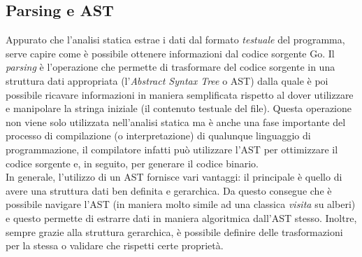 \subsection{Parsing e AST}
Appurato che l'analisi statica estrae i dati dal formato \emph{testuale} del programma, serve capire come è possibile ottenere informazioni dal codice sorgente Go. Il \emph{parsing} è l'operazione che permette di trasformare del codice sorgente in una struttura dati appropriata (l'\emph{Abstract Syntax Tree} o AST) dalla quale è poi possibile ricavare informazioni in maniera semplificata rispetto al dover utilizzare e manipolare la stringa iniziale (il contenuto testuale del file). Questa operazione non viene solo utilizzata nell'analisi statica ma è anche una fase importante del processo di compilazione (o interpretazione) di qualunque linguaggio di programmazione, il compilatore infatti può utilizzare l'AST per ottimizzare il codice sorgente e, in seguito, per generare il codice binario.\\
In generale, l'utilizzo di un AST fornisce vari vantaggi: il principale è quello di avere una struttura dati ben definita e gerarchica. Da questo consegue che è possibile navigare l'AST (in maniera molto simile ad una classica \emph{visita} su alberi) e questo permette di estrarre dati in maniera algoritmica dall'AST stesso. Inoltre, sempre grazie alla struttura gerarchica, è possibile definire delle trasformazioni per la stessa o validare che rispetti certe proprietà.